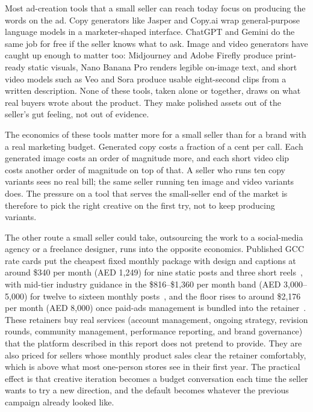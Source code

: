 \documentclass[12pt,a4paper]{report}
\begin{document}
Most ad-creation tools that a small seller can reach today focus on producing the words on the ad. Copy generators like Jasper and Copy.ai wrap general-purpose language models in a marketer-shaped interface. ChatGPT and Gemini do the same job for free if the seller knows what to ask. Image and video generators have caught up enough to matter too: Midjourney and Adobe Firefly produce print-ready static visuals, Nano Banana Pro renders legible on-image text, and short video models such as Veo and Sora produce usable eight-second clips from a written description. None of these tools, taken alone or together, draws on what real buyers wrote about the product. They make polished assets out of the seller's gut feeling, not out of evidence.

The economics of these tools matter more for a small seller than for a brand with a real marketing budget. Generated copy costs a fraction of a cent per call. Each generated image costs an order of magnitude more, and each short video clip costs another order of magnitude on top of that. A seller who runs ten copy variants sees no real bill; the same seller running ten image and video variants does. The pressure on a tool that serves the small-seller end of the market is therefore to pick the right creative on the first try, not to keep producing variants.

The other route a small seller could take, outsourcing the work to a social-media agency or a freelance designer, runs into the opposite economics. Published GCC rate cards put the cheapest fixed monthly package with design and captions at around \$340 per month (AED 1,249) for nine static posts and three short reels~\cite{si3packages}, with mid-tier industry guidance in the \$816--\$1,360 per month band (AED 3,000--5,000) for twelve to sixteen monthly posts~\cite{vpatchpricing}, and the floor rises to around \$2,176 per month (AED 8,000) once paid-ads management is bundled into the retainer~\cite{digitalwisepackages}. These retainers buy real services (account management, ongoing strategy, revision rounds, community management, performance reporting, and brand governance) that the platform described in this report does not pretend to provide. They are also priced for sellers whose monthly product sales clear the retainer comfortably, which is above what most one-person stores see in their first year. The practical effect is that creative iteration becomes a budget conversation each time the seller wants to try a new direction, and the default becomes whatever the previous campaign already looked like.
\end{document}
